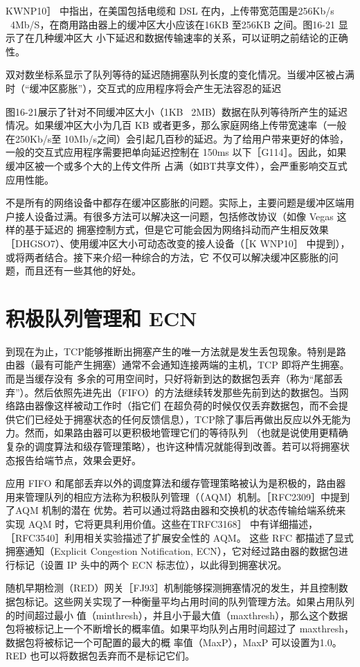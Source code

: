 KWNP10］ 中指出，在美国包括电缆和 DSL 在内，上传带宽范围是256Kb/s ~4Mb/S，在商用路由器上的缓冲区大小应该在16KB 至256KB 之间。图16-21 显示了在几种缓冲区大
小下延迟和数据传输速率的关系，可以证明之前结论的正确性。

双对数坐标系显示了队列等待的延迟随拥塞队列长度的变化情况。当缓冲区被占满时（“缓冲区膨胀”），交互式的应用程序将会产生无法容忍的延迟

图16-21展示了针对不同缓冲区大小（1KB ~2MB）数据在队列等待所产生的延迟情况。如果缓冲区大小为几百 KB 或者更多，那么家庭网络上传带宽速率（一般在250Kb/s至
10Mb/s之间）会引起几百秒的延迟。为了给用户带来更好的体验，一般的交互式应用程序需要把单向延迟控制在 150ms 以下［G114］。因此，如果缓冲区被一个或多个大的上传文件所
占满（如BT共享文件），会严重影响交互式应用性能。

不是所有的网络设备中都存在缓冲区膨胀的问题。实际上，主要问题是缓冲区端用户接人设备过满。有很多方法可以解决这一问题，包括修改协议（如像 Vegas 这样的基于延迟的
拥塞控制方式，但是它可能会因为网络抖动而产生相反效果 ［DHGSO7）、使用缓冲区大小可动态改变的接人设备（［K WNP10］ 中提到），或将两者结合。接下来介绍一种综合的方法，它
不仅可以解决缓冲区膨胀的问题，而且还有一些其他的好处。

\section{积极队列管理和 ECN}
到现在为止，TCP能够推断出拥塞产生的唯一方法就是发生丢包现象。特别是路由器（最有可能产生拥塞）通常不会通知连接两端的主机，TCP 即将产生拥塞。而是当缓存没有
多余的可用空间时，只好将新到达的数据包丢弃（称为“尾部丢弃”）。然后依照先进先出（FIFO）的方法继续转发那些先前到达的数据包。当网络路由器像这样被动工作时（指它们
在超负荷的时候仅仅丢弃数据包，而不会提供它们已经处于拥塞状态的任何反馈信息），TCP除了事后再做出反应以外无能为力。然而，如果路由器可以更积极地管理它们的等待队列
（也就是说使用更精确复杂的调度算法和级存管理策略），也许这种情况就能得到改善。若可以将拥塞状态报告给端节点，效果会更好。

应用 FIFO 和尾部丢弃以外的调度算法和缓存管理策略被认为是积极的，路由器用来管理队列的相应方法称为积极队列管理（（AQM）机制。［RFC2309］中提到了AQM 机制的潜在
优势。若可以通过将路由器和交换机的状态传输给端系统来实现 AQM 时，它将更具利用价值。这些在TRFC3168］ 中有详细描述，［RFC3540］利用相关实验描述了扩展安全性的 AQM。
这些 RFC 都描述了显式拥塞通知（Explicit Congestion Notification, ECN），它对经过路由器的数据包进行标记（设置 IP 头中的两个 ECN 标志位），以此得到拥塞状况。

随机早期检测（RED）网关［FJ93］机制能够探测拥塞情况的发生，并且控制数据包标记。这些网关实现了一种衡量平均占用时间的队列管理方法。如果占用队列的时间超过最小
值（minthresh），并且小于最大值（maxthresh），那么这个数据包将被标记上一个不断增长的概率值。如果平均队列占用时间超过了 maxthresh，数据包将被标记一个可配置的最大的概
率值（MaxP），MaxP 可以设置为1.0。RED 也可以将数据包丢弃而不是标记它们。

